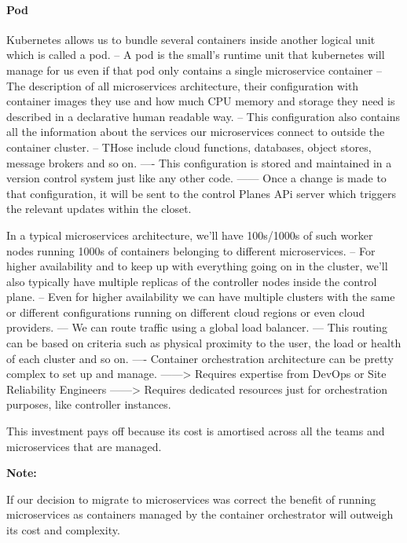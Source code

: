 \documentclass[a4paper, 11pt]{book}
\newenvironment{note}{
    \begin{siderule}
        \textbf{Note: }
        }{
    \end{siderule}}
\begin{document}
    \paragraph{Pod}
    Kubernetes allows us to bundle several containers inside another logical unit which is called a pod.
    -- A pod is the small's runtime unit that kubernetes will manage for us even if that pod only contains a single microservice container
    -- The description of all microservices architecture, their configuration with container images they use and how much CPU memory and storage they need is described in a declarative human readable way.
    -- This configuration also contains all the information about the services our microservices connect to outside the container cluster.
    -- THose include cloud functions, databases, object stores, message brokers and so on.
    ---- This configuration is stored and maintained in a version control system just like any other code.
    ------ Once a change is made to that configuration, it will be sent to the control Planes APi server which triggers the relevant updates within the closet.

    In a typical microservices architecture, we'll have 100s/1000s of such worker nodes running 1000s of containers belonging to different microservices.
    -- For higher availability and to keep up with everything going on in the cluster, we'll also typically have multiple replicas of the controller nodes inside the control plane.
    -- Even for higher availability we can have multiple clusters with the same or different configurations running on different cloud regions or even cloud providers.
    --- We can route traffic using a global load balancer.
    --- This routing can be based on criteria such as physical proximity to the user, the load or health of each cluster and so on.
    ---- Container orchestration architecture can be pretty complex to set up and manage.
    ------> Requires expertise from DevOps or Site Reliability Engineers
    ------> Requires dedicated resources just for orchestration purposes, like controller instances.

    This investment pays off because its cost is amortised across all the teams and microservices that are managed.

\begin{note}
    If our decision to migrate to microservices was correct the benefit of running microservices as containers managed by the container orchestrator will outweigh its cost and complexity.
\end{note}
\end{document}
